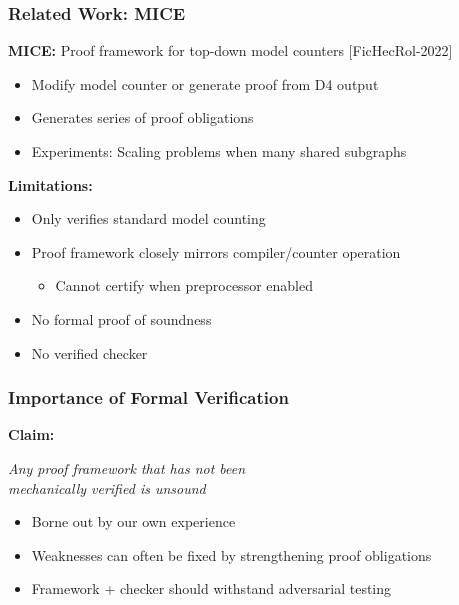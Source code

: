 \documentclass[t,pdf]{beamer}
\newcommand{\reference}[1]{{\footnotesize [#1]}}
\newcommand{\bitem}{\item[$\bullet$]}
\begin{document}
\begin{frame}
  \frametitle{Related Work: MICE}
  \medskip
   {\bf MICE:} Proof framework for top-down model counters \reference{FicHecRol-2022}
   \begin{itemize}
   \item Modify model counter or generate proof from D4 output
   \item Generates series of proof obligations
   \item Experiments: Scaling problems when many shared subgraphs
   \end{itemize}
   \medskip
       {\bf Limitations:}
       \begin{itemize}
       \item Only verifies standard model counting
       \item Proof framework closely mirrors compiler/counter operation
         \begin{itemize}
           \bitem Cannot certify when preprocessor enabled
         \end{itemize}
       \item No formal proof of soundness
       \item No verified checker
       \end{itemize}
\end{frame}



\begin{frame}
\frametitle{Importance of Formal Verification}

\bigskip
    {\bf Claim:}
    
\medskip
\begin{center}
{\em\Large Any proof framework that has not been \\[0.3em] mechanically verified is unsound}
\end{center}
\medskip

         \begin{itemize}
           \item Borne out by our own experience
           \item Weaknesses can often be fixed by strengthening proof obligations
           \item Framework + checker should withstand adversarial testing
         \end{itemize}

\end{frame}
\end{document}
